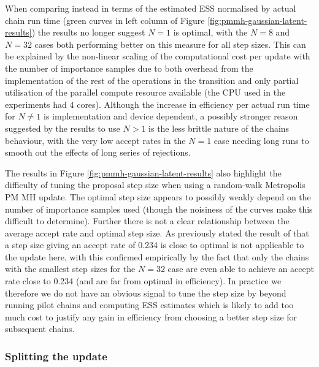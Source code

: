 When comparing instead in terms of the estimated \ac{ESS} normalised by actual chain run time (green curves in left column of Figure \ref{fig:pmmh-gaussian-latent-results}) the results no longer suggest $N=1$ is optimal, with the $N=8$ and $N=32$ cases both performing better on this measure for all step sizes. This can be explained by the non-linear scaling of the computational cost per update with the number of importance samples due to both overhead from the implementation of the rest of the operations in the transition and only partial utilisation of the parallel compute resource available (the \ac{CPU} used in the experiments had 4 cores). Although the increase in efficiency per actual run time for $N\neq 1$ is implementation and device dependent, a possibly stronger reason suggested by the results to use $N > 1$ is the less brittle nature of the chains behaviour, with the very low accept rates in the $N=1$ case needing long runs to smooth out the effects of long series of rejections.

The results in Figure \ref{fig:pmmh-gaussian-latent-results} also highlight the difficulty of tuning the proposal step size when using a random-walk Metropolis \ac{PM} \ac{MH} update. The optimal step size appears to possibly weakly depend on the number of importance samples used (though the noisiness of the curves make this difficult to determine). Further there is not a clear relationship between the average accept rate and optimal step size. As previously stated the result of \citep{gelman1997weak} that a step size giving an accept rate of 0.234 is close to optimal is not applicable to the update here, with this confirmed empirically by the fact that only the chains with the smallest step sizes for the $N=32$ case are even able to achieve an accept rate close to 0.234 (and are far from optimal in efficiency). In practice we therefore we do not have an obvious signal to tune the step size by beyond running pilot chains and computing \ac{ESS} estimates which is likely to add too much cost to justify any gain in efficiency from choosing a better step size for subsequent chains.

\subsubsection{Splitting the update}

